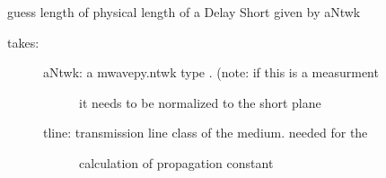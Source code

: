 \documentclass[letterpaper,10pt,english]{sphinxmanual}
\begin{document}

\begin{fulllineitems}
\label{api/mwavepy.calibration:mwavepy.calibration.calibrationAlgorithms.eight_term_2_one_port_coefs}
\end{fulllineitems}


\begin{fulllineitems}
\label{api/mwavepy.calibration:mwavepy.calibration.calibrationAlgorithms.guess_length_of_delay_short}
guess length of physical length of a Delay Short given by aNtwk
\begin{description}
\item[{takes:}] \leavevmode\begin{description}
\item[{aNtwk: a mwavepy.ntwk type . (note: if this is a measurment }] \leavevmode
it needs to be normalized to the short plane

\item[{tline: transmission line class of the medium. needed for the }] \leavevmode
calculation of propagation constant

\end{description}

\end{description}

\end{fulllineitems}

\end{document}
